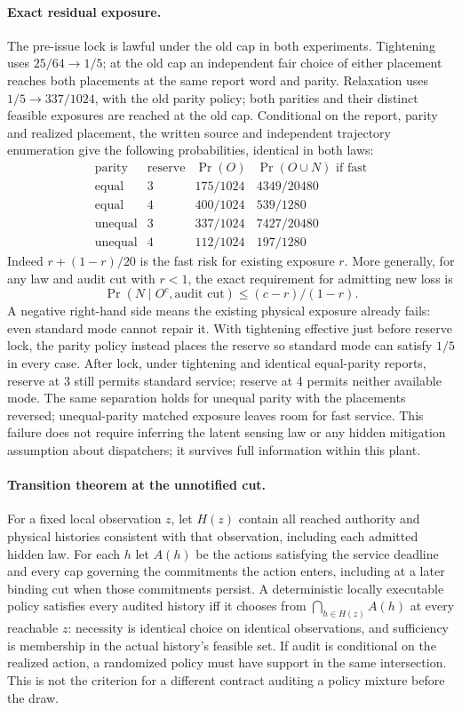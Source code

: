 \documentclass[11pt]{article}
\begin{document}
\paragraph{Exact residual exposure.}
The pre-issue lock is lawful under the old cap in both experiments. Tightening uses $25/64\to 1/5$; at the old cap an independent fair choice of either placement reaches both placements at the same report word and parity. Relaxation uses $1/5\to337/1024$, with the old parity policy; both parities and their distinct feasible exposures are reached at the old cap. Conditional on the report, parity and realized placement, the written source and independent trajectory enumeration give the following probabilities, identical in both laws:
\[
\begin{array}{c|c|c|c}
\text{parity}&\text{reserve}&\Pr(O)&\Pr(O\cup N)\text{ if fast}\\\hline
\text{equal}&3&175/1024&4349/20480\\
\text{equal}&4&400/1024&539/1280\\
\text{unequal}&3&337/1024&7427/20480\\
\text{unequal}&4&112/1024&197/1280
\end{array}
\]
Indeed $r+(1-r)/20$ is the fast risk for existing exposure $r$. More generally, for any law and audit cut with $r<1$, the exact requirement for admitting new loss is
\[
 \Pr(N\mid O^c,\text{audit cut})\le (c-r)/(1-r).
\]
A negative right-hand side means the existing physical exposure already fails: even standard mode cannot repair it. With tightening effective just before reserve lock, the parity policy instead places the reserve so standard mode can satisfy $1/5$ in every case. After lock, under tightening and identical equal-parity reports, reserve at 3 still permits standard service; reserve at 4 permits neither available mode. The same separation holds for unequal parity with the placements reversed; unequal-parity matched exposure leaves room for fast service. This failure does not require inferring the latent sensing law or any hidden mitigation assumption about dispatchers; it survives full information within this plant.

\paragraph{Transition theorem at the unnotified cut.}
For a fixed local observation $z$, let $H(z)$ contain all reached authority and physical histories consistent with that observation, including each admitted hidden law. For each $h$ let $A(h)$ be the actions satisfying the service deadline and every cap governing the commitments the action enters, including at a later binding cut when those commitments persist. A deterministic locally executable policy satisfies every audited history iff it chooses from $\bigcap_{h\in H(z)}A(h)$ at every reachable $z$: necessity is identical choice on identical observations, and sufficiency is membership in the actual history's feasible set. If audit is conditional on the realized action, a randomized policy must have support in the same intersection. This is not the criterion for a different contract auditing a policy mixture before the draw.
\end{document}

